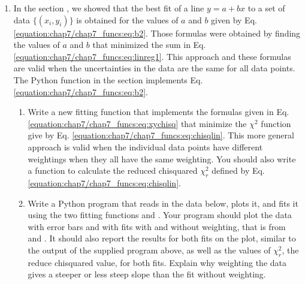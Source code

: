 \documentclass[letterpaper,10pt,english]{sphinxmanual}
\begin{document}
\begin{enumerate}
\begin{figure}[htbp]
\noindent{}
\end{figure}

\item {} 
\sphinxAtStartPar
In the section {\hyperref[\detokenize{chap7/chap7_funcs:linfitfunc}]{}}, we showed that the best fit of a line \(y = a + bx\) to a set of data \(\{(x_i,y_i)\}\) is obtained for the values of \(a\) and \(b\) given by Eq. \eqref{equation:chap7/chap7_funcs:eq:b2}.  Those formulas were obtained by finding the values of \(a\) and \(b\) that minimized the sum in Eq. \eqref{equation:chap7/chap7_funcs:eq:linreg1}. This approach and these formulas are valid when the uncertainties in the data are the same for all data points.  The Python function  in the section {\hyperref[\detokenize{chap7/chap7_funcs:linfitfunc}]{}} implements Eq. \eqref{equation:chap7/chap7_funcs:eq:b2}.
\begin{enumerate}
%
\item {} 
\sphinxAtStartPar
Write a new fitting function  that implements the formulas given in Eq. \eqref{equation:chap7/chap7_funcs:eq:xychisq} that minimize the \(\chi^2\) function give by Eq. \eqref{equation:chap7/chap7_funcs:eq:chisqlin}.  This more general approach is valid when the individual data points have different weightings  when they all have the same weighting.  You should also write a function to calculate the reduced chi\sphinxhyphen{}squared \(\chi_r^2\) defined by Eq. \eqref{equation:chap7/chap7_funcs:eq:chisqlin}.

\item {} 
\sphinxAtStartPar
Write a Python program that reads in the data below, plots it, and fits it using the two fitting functions   and .  Your program should plot the data with error bars and with  fits with and without weighting, that is from  and .  It should also report the results for both fits on the plot, similar to the output of the supplied program above, as well as the values of \(\chi_r^2\), the reduce chi\sphinxhyphen{}squared value, for both fits.  Explain why weighting the data gives a steeper or less steep slope than the fit without weighting.


\end{enumerate}
\end{enumerate}
\end{document}
